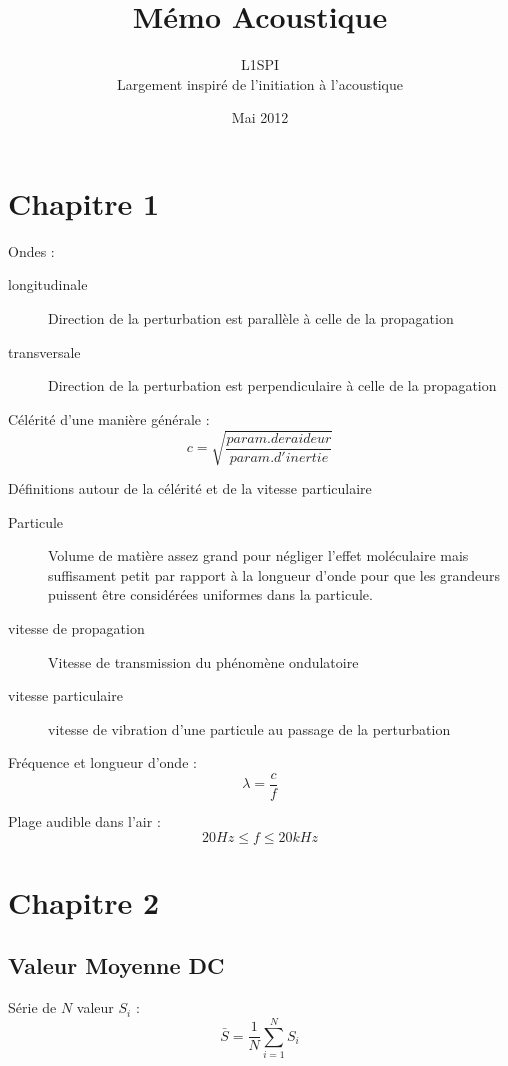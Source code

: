 \documentclass[a4paper, 11pt]{article}
\title{Mémo Acoustique}
\author{L1SPI\\
        Largement inspiré de l'initiation à l'acoustique}
\date{Mai 2012}
\begin{document}
	\maketitle

    \section{Chapitre 1}

    Ondes :
    \begin{description}
        \item[longitudinale] Direction de la perturbation est parallèle à celle de la propagation
        \item[transversale] Direction de la perturbation est perpendiculaire à celle de la propagation
    \end{description}

    Célérité d'une manière générale :
    $$c = \sqrt{\frac{param. de raideur}{param. d'inertie}}$$

    Définitions autour de la célérité et de la vitesse particulaire

    \begin{description}
        \item[Particule] Volume de matière assez grand pour négliger l'effet moléculaire mais suffisament petit par rapport à la longueur d'onde pour que les grandeurs puissent être considérées uniformes dans la particule.
        \item[vitesse de propagation] Vitesse de transmission du phénomène ondulatoire
        \item[vitesse particulaire] vitesse de vibration d'une particule au passage de la perturbation
    \end{description}

    Fréquence et longueur d'onde :
    $$\lambda = \frac{c}{f}$$

    Plage audible dans l'air :
    $$20Hz \leq f \leq 20kHz$$


    \section{Chapitre 2}

    \subsection{Valeur Moyenne DC}

    Série de $N$ valeur $S_i$ :
    $$\bar{S} = \frac{1}{N}\sum_{i=1}^NS_i$$
\end{document}
